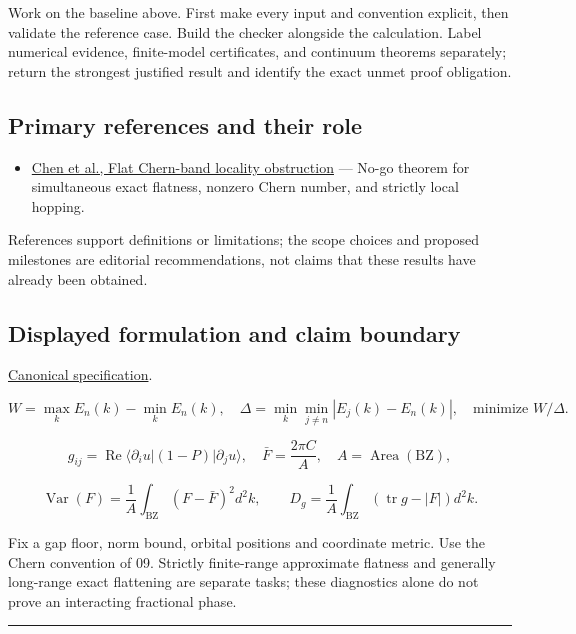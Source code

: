 \documentclass[
  11pt,
]{article}
\providecommand{\tightlist}{%
  \setlength{\itemsep}{0pt}\setlength{\parskip}{0pt}}
\begin{document}
Work on the baseline above. First make every input and convention
explicit, then validate the reference case. Build the checker alongside
the calculation. Label numerical evidence, finite-model certificates,
and continuum theorems separately; return the strongest justified result
and identify the exact unmet proof obligation.

\subsection{Primary references and their role}

\begin{itemize}
\tightlist
\item
  \href{https://arxiv.org/abs/1311.4956}{Chen et al., Flat Chern-band
  locality obstruction} --- No-go theorem for simultaneous exact
  flatness, nonzero Chern number, and strictly local hopping.
\end{itemize}

References support definitions or limitations; the scope choices and
proposed milestones are editorial recommendations, not claims that these
results have already been obtained.

\subsection{Displayed formulation and claim boundary}

\href{https://github.com/rick-stevens-ai/Pure-Thought/blob/main/PRDs/10-Flat-Chern-Bands.md}{Canonical
specification}.

\[W=\max_k E_n(k)-\min_k E_n(k),\quad
\Delta=\min_k\min_{j\ne n}|E_j(k)-E_n(k)|,\quad\text{minimize }W/\Delta.\]

\[g_{ij}=\operatorname{Re}\langle\partial_i u|(1-P)|\partial_j u\rangle,
\quad \bar F=\frac{2\pi C}{A},\quad A=\operatorname{Area}(\mathrm{BZ}),\]

\[\operatorname{Var}(F)=\frac1A\int_{\mathrm{BZ}}(F-\bar F)^2d^2k,
\qquad D_g=\frac1A\int_{\mathrm{BZ}}(\operatorname{tr}g-|F|)d^2k.\]

Fix a gap floor, norm bound, orbital positions and coordinate metric.
Use the Chern convention of 09. Strictly finite-range approximate
flatness and generally long-range exact flattening are separate tasks;
these diagnostics alone do not prove an interacting fractional phase.

\begin{center}\rule{0.5\linewidth}{0.5pt}\end{center}
\end{document}
